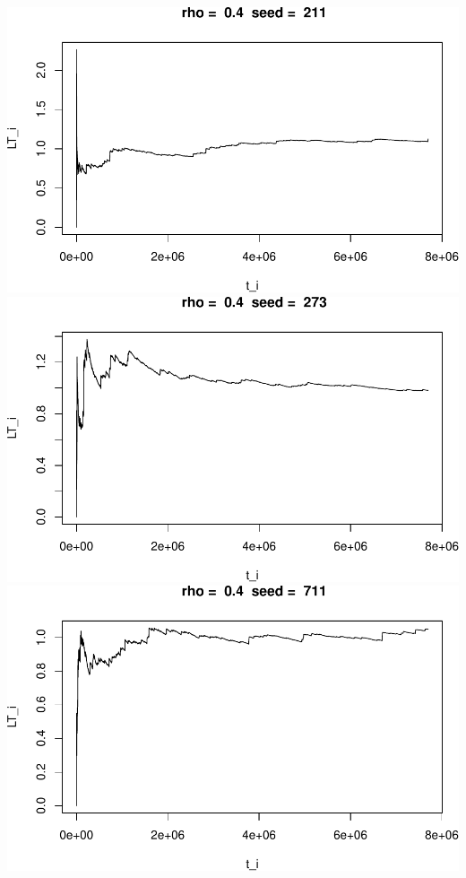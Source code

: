 \documentclass[]{article}
\begin{document}
\includegraphics{003_files/figure-latex/unnamed-chunk-13-4.pdf}
\includegraphics{003_files/figure-latex/unnamed-chunk-13-5.pdf}
\includegraphics{003_files/figure-latex/unnamed-chunk-13-6.pdf}
\end{document}
